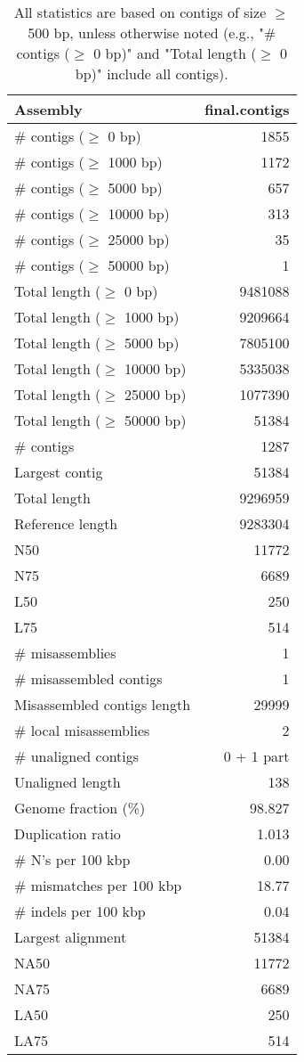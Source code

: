 \documentclass[12pt,a4paper]{article}
\begin{document}
\begin{table}[ht]
\begin{center}
\caption{All statistics are based on contigs of size $\geq$ 500 bp, unless otherwise noted (e.g., "\# contigs ($\geq$ 0 bp)" and "Total length ($\geq$ 0 bp)" include all contigs).}
\begin{tabular}{|l*{1}{|r}|}
\hline
Assembly & final.contigs \\ \hline
\# contigs ($\geq$ 0 bp) & 1855 \\ \hline
\# contigs ($\geq$ 1000 bp) & 1172 \\ \hline
\# contigs ($\geq$ 5000 bp) & 657 \\ \hline
\# contigs ($\geq$ 10000 bp) & 313 \\ \hline
\# contigs ($\geq$ 25000 bp) & 35 \\ \hline
\# contigs ($\geq$ 50000 bp) & 1 \\ \hline
Total length ($\geq$ 0 bp) & 9481088 \\ \hline
Total length ($\geq$ 1000 bp) & 9209664 \\ \hline
Total length ($\geq$ 5000 bp) & 7805100 \\ \hline
Total length ($\geq$ 10000 bp) & 5335038 \\ \hline
Total length ($\geq$ 25000 bp) & 1077390 \\ \hline
Total length ($\geq$ 50000 bp) & 51384 \\ \hline
\# contigs & 1287 \\ \hline
Largest contig & 51384 \\ \hline
Total length & 9296959 \\ \hline
Reference length & 9283304 \\ \hline
N50 & 11772 \\ \hline
N75 & 6689 \\ \hline
L50 & 250 \\ \hline
L75 & 514 \\ \hline
\# misassemblies & 1 \\ \hline
\# misassembled contigs & 1 \\ \hline
Misassembled contigs length & 29999 \\ \hline
\# local misassemblies & 2 \\ \hline
\# unaligned contigs & 0 + 1 part \\ \hline
Unaligned length & 138 \\ \hline
Genome fraction (\%) & 98.827 \\ \hline
Duplication ratio & 1.013 \\ \hline
\# N's per 100 kbp & 0.00 \\ \hline
\# mismatches per 100 kbp & 18.77 \\ \hline
\# indels per 100 kbp & 0.04 \\ \hline
Largest alignment & 51384 \\ \hline
NA50 & 11772 \\ \hline
NA75 & 6689 \\ \hline
LA50 & 250 \\ \hline
LA75 & 514 \\ \hline
\end{tabular}
\end{center}
\end{table}
\end{document}
